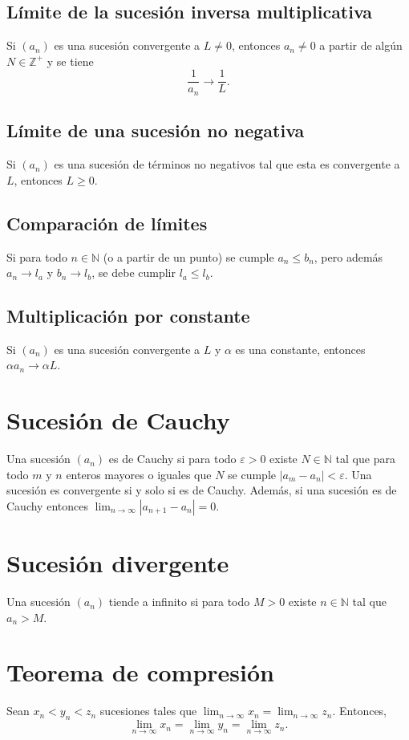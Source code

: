 \documentclass{article}
\begin{document}
\subsection*{Límite de la sucesión inversa multiplicativa}
Si $(a_n)$ es una sucesión convergente a $L\neq0$, entonces $a_n\neq0$ a partir de algún $N\in\mathbb{Z}^+$ y se tiene
$$\frac{1}{a_n}\to \frac{1}{L}.$$

\subsection*{Límite de una sucesión no negativa}
Si $(a_n)$ es una sucesión de términos no negativos tal que esta es convergente a $L$, entonces $L\geq 0$.

\subsection*{Comparación de límites}
Si para todo $n\in\mathbb{N}$ (o a partir de un punto) se cumple $a_n\leq b_n$, pero además $a_n\to l_a$ y $b_n\to l_b$, se debe cumplir $l_a\leq l_b$.

\subsection*{Multiplicación por constante}
Si $(a_n)$ es una sucesión convergente a $L$ y $\alpha$ es una constante, entonces $\alpha a_n\to \alpha L$.

\section*{Sucesión de Cauchy}
Una sucesión $(a_n)$ es de Cauchy si para todo $\varepsilon>0$ existe $N\in\mathbb{N}$ tal que para todo $m$ y $n$ enteros mayores o iguales que $N$ se cumple $|a_m-a_n|<\varepsilon$. Una sucesión es convergente si y solo si es de Cauchy. Además, si una sucesión es de Cauchy entonces $\displaystyle\lim_{n\to\infty}|a_{n+1}-a_n|=0$.

\section*{Sucesión divergente}
Una sucesión $(a_n)$ tiende a infinito si para todo $M>0$ existe $n\in\mathbb{N}$ tal que $a_n>M$.

\section*{Teorema de compresión} 
Sean $x_n< y_n< z_n$ sucesiones tales que $\displaystyle\lim_{n\to\infty}x_n=\displaystyle\lim_{n\to\infty}z_n$. Entonces,
$$\lim_{n\to\infty}x_n=\lim_{n\to\infty}y_n=\lim_{n\to\infty}z_n.$$
\end{document}
